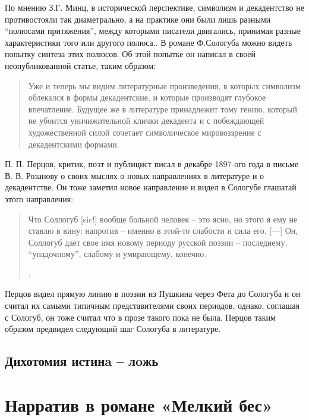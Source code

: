 \documentclass[12pt,a4paper]{article}
\begin{document}
По мнению З.Г. Минц, в исторической перспективе, символизм и декадентство не противостояли так диаметрально, а на практике они были лишь разными \enquote{полюсами притяжения}, между которыми писатели двигались, принимая разные характеристики того или другого полюса.\parencite[62]{mints2004}. В романе Ф.Сологуба можно видеть попытку синтеза этих полюсов. Об этой попытке он написал в своей неопубликованной статье, таким образом:

\begin{quote}
Уже и теперь мы видим литературные произведения, в которых символизм облекался в формы декадентские, и которые производят глубокое впечатление. Будущее же в литературе принадлежит тому гению, который не убоится уничижительной клички декадента и с побеждающей художественной силой сочетает символическое мировоззрение с декадентскими формами.
\parencite[501.]{ref:sologub2007}
\end{quote}

П. П. Перцов, критик, поэт и публицист писал в декабре 1897-ого года в письме В. В. Розанову о своих мыслях о новых направлениях в литературе и о декадентстве. Он тоже заметил новое направление и видел в Сологубе глашатай этого направления: 

\begin{quote}
Что Соллогуб [sic!] вообще больной человек – это ясно, но этого я ему не ставлю в вину: напротив – именно в этой-то слабости и сила его. [---] Он, Соллогуб дает свое имя новому периоду русской поэзии – последнему, \enquote{упадочному}, слабому и умирающему, конечно.

\parencite[536]{pavlova2016}.
\end{quote}

Перцов видел прямую линию в поэзии из Пушкина через Фета до Сологуба и он считал их самыми типичным представителями своих периодов, однако, соглашая с Сологуб, он тоже считал что в прозе такого пока не была. Перцов таким образом предвидел следующий шаг Сологуба в литературе.




\subsection{Дихотомия истинa – лoжь}
\section{Нарратив в романе «Мелкий бес»}
\end{document}
